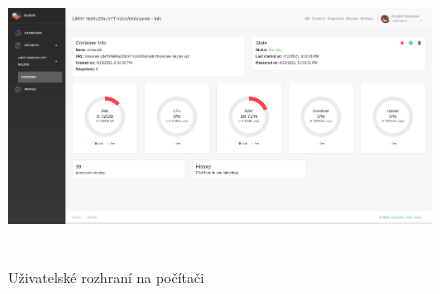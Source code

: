 \documentclass[a4paper,oneside,12pt]{report}
\begin{document}
\begin{figure}[h]
	\centering
	\includegraphics[height=7.8cm]{../img/navbarNonResponsive.png}
	\caption[Uživatelské rozhraní na počítači, vlastní tvorba]{Uživatelské rozhraní na počítači \linebreak}
	\label{fig:desktopRes}
\end{figure}
\end{document}
